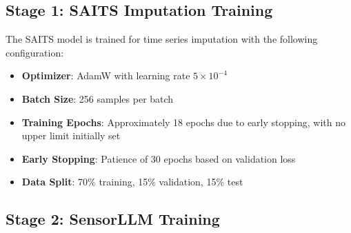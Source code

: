 %
%

\subsection{Stage 1: SAITS Imputation Training}

\hspace{2em}The SAITS model is trained for time series imputation with the following configuration:

\begin{itemize}
    \item \textbf{Optimizer}: AdamW with learning rate $5 \times 10^{-4}$
    \item \textbf{Batch Size}: 256 samples per batch
    \item \textbf{Training Epochs}: Approximately 18 epochs due to early stopping, with no upper limit initially set
    \item \textbf{Early Stopping}: Patience of 30 epochs based on validation loss
    \item \textbf{Data Split}: 70\% training, 15\% validation, 15\% test
\end{itemize}

\subsection{Stage 2: SensorLLM Training}

